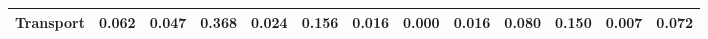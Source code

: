 \begin{table}[htbp]
\begin{tabular}{lcccccccccccc}
  Transport & \textcolor[RGB]{119,77,136}{0.062} & \textcolor[RGB]{135,87,120}{0.047} & \textcolor[RGB]{11,7,244}{0.368} & \textcolor[RGB]{159,103,96}{0.024} & \textcolor[RGB]{32,21,223}{0.156} & \textcolor[RGB]{184,119,71}{0.016} & \textcolor[RGB]{248,160,7}{0.000} & \textcolor[RGB]{186,120,69}{0.016} & \textcolor[RGB]{89,57,166}{0.080} & \textcolor[RGB]{35,23,220}{0.150} & \textcolor[RGB]{220,142,35}{0.007} & \textcolor[RGB]{97,63,158}{0.072} \\ 
   \hline
\end{tabular}
\end{table}
